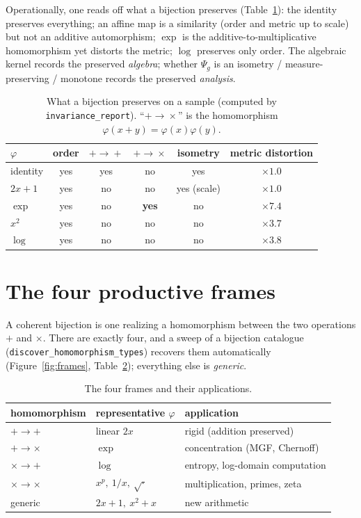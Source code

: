\documentclass[11pt,a4paper]{article}
\newcommand{\code}[1]{\texttt{#1}}
\theoremstyle{plain}
\theoremstyle{definition}
\theoremstyle{remark}
\begin{document}
Operationally, one reads off what a bijection preserves
(Table~\ref{tab:invariance}): the identity preserves everything; an affine map
is a similarity (order and metric up to scale) but not an additive
automorphism; $\exp$ is the additive-to-multiplicative homomorphism yet distorts
the metric; $\log$ preserves only order. The algebraic kernel records the
preserved \emph{algebra}; whether $\Psi_g$ is an isometry / measure-preserving /
monotone records the preserved \emph{analysis}.

\begin{table}[ht]
\centering
\caption{What a bijection preserves on a sample (computed by
\code{invariance\_report}). ``$+\!\to\!\times$'' is the homomorphism
$\varphi(x{+}y)=\varphi(x)\varphi(y)$.}
\label{tab:invariance}
\begin{tabular}{lccccc}
\toprule
$\varphi$ & order & $+\!\to\!+$ & $+\!\to\!\times$ & isometry & metric distortion \\
\midrule
identity & yes & yes & no  & yes & $\times 1.0$ \\
$2x{+}1$ & yes & no  & no  & yes (scale) & $\times 1.0$ \\
$\exp$   & yes & no  & \textbf{yes} & no  & $\times 7.4$ \\
$x^2$    & yes & no  & no  & no  & $\times 3.7$ \\
$\log$   & yes & no  & no  & no  & $\times 3.8$ \\
\bottomrule
\end{tabular}
\end{table}

\section{The four productive frames}
\label{sec:frames}

A coherent bijection is one realizing a homomorphism between the two operations
$+$ and $\times$. There are exactly four, and a sweep of a bijection catalogue
(\code{discover\_homomorphism\_types}) recovers them automatically
(Figure~\ref{fig:frames}, Table~\ref{tab:frames}); everything else is
\emph{generic}.

\begin{table}[ht]
\centering
\caption{The four frames and their applications.}
\label{tab:frames}
\begin{tabular}{lll}
\toprule
homomorphism & representative $\varphi$ & application \\
\midrule
$+\to+$ & linear $2x$ & rigid (addition preserved) \\
$+\to\times$ & $\exp$ & concentration (MGF, Chernoff) \\
$\times\to+$ & $\log$ & entropy, log-domain computation \\
$\times\to\times$ & $x^p,\ 1/x,\ \sqrt{\cdot}$ & multiplication, primes, zeta \\
\midrule
generic & $2x{+}1,\ x^2{+}x$ & new arithmetic \\
\bottomrule
\end{tabular}
\end{table}
\end{document}
